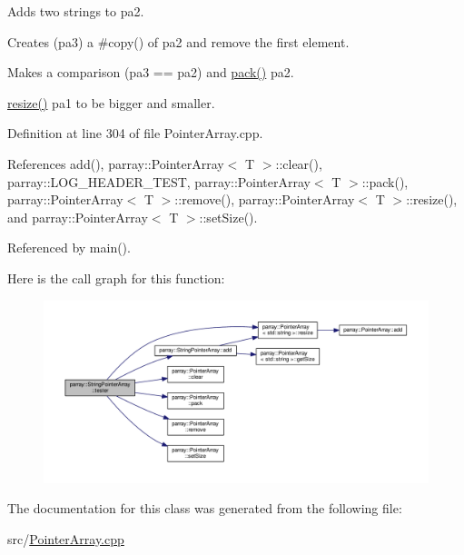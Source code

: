 Adds two strings to pa2.

Creates (pa3) a \#copy() of pa2 and remove the first element.

Makes a comparison (pa3 == pa2) and \hyperlink{classparray_1_1PointerArray_a13883fc7ef994a50a83ae3f9ddc4db27}{pack()} pa2.

\hyperlink{classparray_1_1PointerArray_a6d4347a899d2783d23775957ad71f743}{resize()} pa1 to be bigger and smaller. 

Definition at line 304 of file Pointer\-Array.\-cpp.



References add(), parray\-::\-Pointer\-Array$<$ T $>$\-::clear(), parray\-::\-L\-O\-G\-\_\-\-H\-E\-A\-D\-E\-R\-\_\-\-T\-E\-S\-T, parray\-::\-Pointer\-Array$<$ T $>$\-::pack(), parray\-::\-Pointer\-Array$<$ T $>$\-::remove(), parray\-::\-Pointer\-Array$<$ T $>$\-::resize(), and parray\-::\-Pointer\-Array$<$ T $>$\-::set\-Size().



Referenced by main().



Here is the call graph for this function\-:
\nopagebreak
\begin{figure}[H]
\begin{center}
\leavevmode
\includegraphics[width=350pt]{classparray_1_1StringPointerArray_abfac13570bec8c88311714d19ddea59b_cgraph}
\end{center}
\end{figure}




The documentation for this class was generated from the following file\-:\begin{DoxyCompactItemize}
\item 
src/\hyperlink{PointerArray_8cpp}{Pointer\-Array.\-cpp}\end{DoxyCompactItemize}

